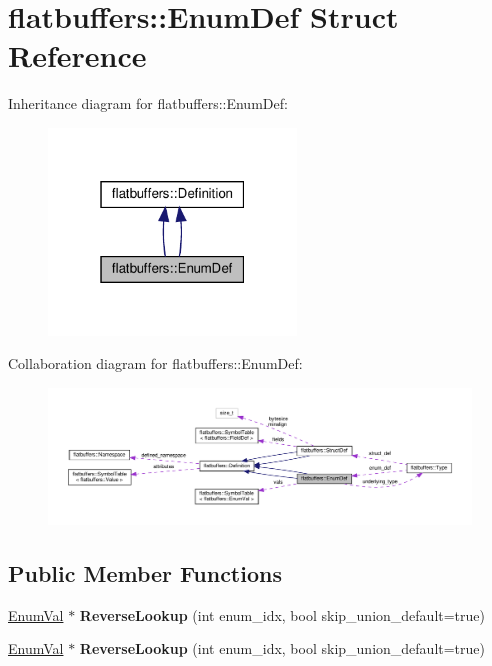 \hypertarget{structflatbuffers_1_1EnumDef}{}\section{flatbuffers\+:\+:Enum\+Def Struct Reference}
\label{structflatbuffers_1_1EnumDef}


Inheritance diagram for flatbuffers\+:\+:Enum\+Def\+:
\nopagebreak
\begin{figure}[H]
\begin{center}
\leavevmode
\includegraphics[width=187pt]{structflatbuffers_1_1EnumDef__inherit__graph}
\end{center}
\end{figure}


Collaboration diagram for flatbuffers\+:\+:Enum\+Def\+:
\nopagebreak
\begin{figure}[H]
\begin{center}
\leavevmode
\includegraphics[width=350pt]{structflatbuffers_1_1EnumDef__coll__graph}
\end{center}
\end{figure}
\subsection*{Public Member Functions}
\begin{DoxyCompactItemize}
\item 
\mbox{\label{structflatbuffers_1_1EnumDef_a97e2dbbd131f4b657de57523bcb96572}} 
\hyperlink{structflatbuffers_1_1EnumVal}{Enum\+Val} $\ast$ {\bfseries Reverse\+Lookup} (int enum\+\_\+idx, bool skip\+\_\+union\+\_\+default=true)
\item 
\mbox{\label{structflatbuffers_1_1EnumDef_a97e2dbbd131f4b657de57523bcb96572}} 
\hyperlink{structflatbuffers_1_1EnumVal}{Enum\+Val} $\ast$ {\bfseries Reverse\+Lookup} (int enum\+\_\+idx, bool skip\+\_\+union\+\_\+default=true)
\end{DoxyCompactItemize}
